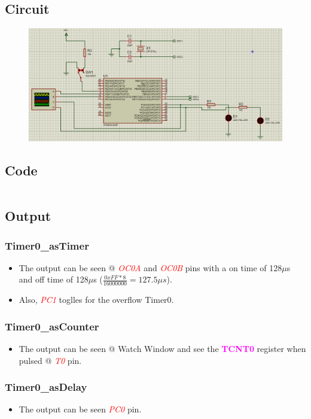\documentclass[oneside]{book}
\newcommand{\pinFormat}[1]{\emph{\textcolor{red}{#1}}}
\newcommand{\regFormat}[1]{\textbf{\textcolor{magenta}{#1}}}
\begin{document}
\subsection{Circuit}
\begin{figure}[H]
    \centering
    \includegraphics[height=0.2\textheight]{TimerCounter0_NormalMode.png}
\end{figure}
\subsection{Code}

\inputminted[breaklines, bgcolor=black]{c}{./programFiles/TimerCounter0_NormalMode.c}

\subsection{Output}
\subsubsection{Timer0\_asTimer}
\begin{itemize}
    \item The output can be seen @ \pinFormat{OC0A} and \pinFormat{OC0B} pins with a on time of 128$\mu$s and off time of 128$\mu$s ($\frac{0xFF * 8}{16000000} = 127.5\mu s$).
    \item Also, \pinFormat{PC1} toglles for the overflow Timer0.
\end{itemize}
\subsubsection{Timer0\_asCounter}
\begin{itemize}
    \item The output can be seen @ Watch Window and see the \regFormat{TCNT0} register when pulsed @ \pinFormat{T0} pin.
\end{itemize}
\subsubsection{Timer0\_asDelay}
\begin{itemize}
    \item The output can be seen \pinFormat{PC0} pin.
\end{itemize}
\end{document}
